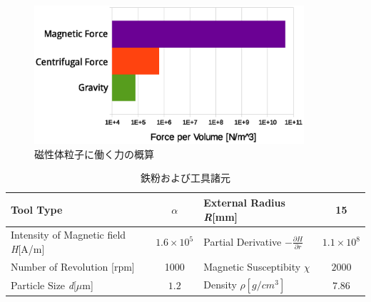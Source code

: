 \documentclass[11pt]{jarticle}
\begin{document}
  \begin{figure}[H]
    \begin{center}
      \includegraphics[width=100mm]{approx.eps}
    \end{center}
    \caption{磁性体粒子に働く力の概算}
    \label{fig:approx}
  \end{figure}

  \begin{table}[H]
    \begin{tabular}{|l|c|l|c|} \hline 
       Tool Type & $\alpha$ & External Radius {\it R}[mm] & 15 \\ \hline
       Intensity of Magnetic field {\it H}[A/m] & $1.6\times10^5$ & Partial Derivative $-\frac{\partial H}{\partial r}$ & $1.1\times10^8$ \\ \hline
       Number of Revolution [rpm] & 1000 & Magnetic Susceptibity $\chi$ & $2000$   \\ \hline
       Particle Size {\it d}[$\mu$m] & $1.2$ & Density {\rm $\rho[g/cm^3]$ } & $7.86$   \\ \hline
    \end{tabular}
    \centering
    \caption{鉄粉および工具諸元}
    \label{tab:iron_tool}
  \end{table}
\end{document}
